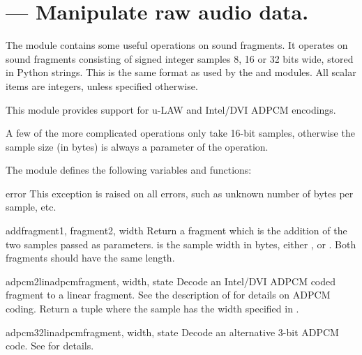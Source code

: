 \section{ ---
         Manipulate raw audio data.}



The  module contains some useful operations on sound
fragments.  It operates on sound fragments consisting of signed
integer samples 8, 16 or 32 bits wide, stored in Python strings.  This
is the same format as used by the  and 
modules.  All scalar items are integers, unless specified otherwise.

This module provides support for u-LAW and Intel/DVI ADPCM encodings.

A few of the more complicated operations only take 16-bit samples,
otherwise the sample size (in bytes) is always a parameter of the
operation.

The module defines the following variables and functions:

\begin{excdesc}{error}
This exception is raised on all errors, such as unknown number of bytes
per sample, etc.
\end{excdesc}

\begin{funcdesc}{add}{fragment1, fragment2, width}
Return a fragment which is the addition of the two samples passed as
parameters.   is the sample width in bytes, either
,  or .  Both fragments should have the same
length.
\end{funcdesc}

\begin{funcdesc}{adpcm2lin}{adpcmfragment, width, state}
Decode an Intel/DVI ADPCM coded fragment to a linear fragment.  See
the description of  for details on ADPCM coding.
Return a tuple  where the sample
has the width specified in .
\end{funcdesc}

\begin{funcdesc}{adpcm32lin}{adpcmfragment, width, state}
Decode an alternative 3-bit ADPCM code.  See 
for details.
\end{funcdesc}

